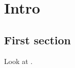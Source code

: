\chapter{Intro}

\section{First section}

Look at \cite{
    CarrollMereo,
    ColafrancheschiPhD,
    szpak2014curved,
    Josset_2017_thermo,
    EinsteinFromEntanglement,
    speranza2018eeg,
    GRQO_2020,
    Shore_QGO,
    OQEG,
    QSimCurved,
    SpacetimeFromEntanglement,
    CMFT,
    SMQO1}.